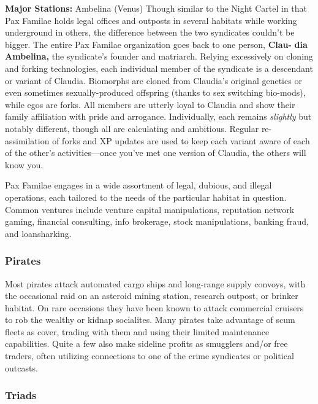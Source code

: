 \textbf{Major Stations: }Ambelina (Venus)
Though similar to the Night Cartel in that Pax Familae 
holds legal offices and outposts in several habitats while 
working underground in others, the difference between 
the two syndicates couldn't be bigger. The entire Pax 
Familae organization goes back to one person, \textbf{Clau-}
\textbf{dia Ambelina,} the syndicate's founder and matriarch. 
Relying excessively on cloning and forking technologies, each individual member of the syndicate is a descendant or variant of Claudia. Biomorphs are cloned 
from Claudia's original genetics or even sometimes 
sexually-produced offspring (thanks to sex switching 
bio-mods), while egos are forks. All members are utterly loyal to Claudia and show their family affiliation 
with pride and arrogance. Individually, each remains 
\textit{slightly} but notably different, though all are calculating 
and ambitious. Regular re-assimilation of forks and XP 
updates are used to keep each variant aware of each of 
the other's activities—once you've met one version of 
Claudia, the others will know you.

Pax Familae engages in a wide assortment of legal, 
dubious, and illegal operations, each tailored to the 
needs of the particular habitat in question. Common 
ventures include venture capital manipulations, 
reputation network gaming, financial  consulting, 
info brokerage, stock manipulations, banking fraud, 
and loansharking.

\subsubsection{Pirates}

Most pirates attack automated cargo ships and long-range supply convoys, with the occasional raid on an 
asteroid mining station, research outpost, or brinker 
habitat. On rare occasions they have been known 
to attack commercial cruisers to rob the wealthy or 
kidnap socialites. Many pirates take advantage of 
scum fleets as cover, trading with them and using their 
limited maintenance capabilities. Quite a few also 
make sideline profits as smugglers and/or free traders, 
often utilizing connections to one of the crime syndicates or political outcasts.

\subsubsection{Triads}

